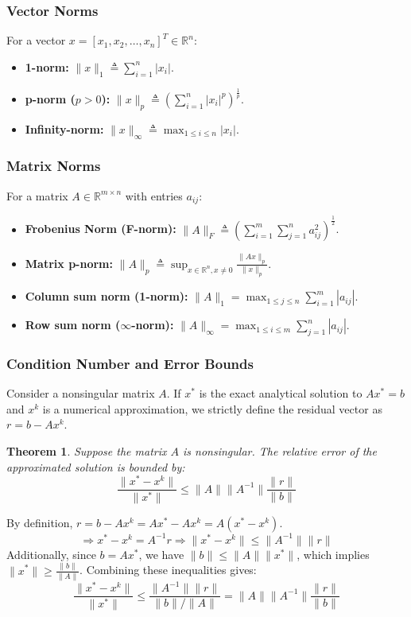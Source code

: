 \documentclass[12pt, a4paper]{article}
\makeatletter
\theoremstyle{break}
\newtheorem{theorem}{Theorem}[section]
\renewenvironment{proof}[1][\proofname]{\par
  \pushQED{\qed}%
  \normalfont \topsep6\p@\@plus6\p@\relax
  \trivlist
  \item[\hskip\labelsep\bfseries #1\@addpunct{.}]\mbox{}\newline\ignorespaces
}{%
  \popQED\endtrivlist\@endpefalse
}
\makeatother
\begin{document}
\subsubsection*{Vector Norms}
For a vector $x = [x_1, x_2, \dots, x_n]^T \in \mathbb{R}^n$:
\begin{itemize}
    \item \textbf{1-norm:} $\|x\|_1 \triangleq \sum_{i=1}^n |x_i|$.
    \item \textbf{p-norm ($p>0$):} $\|x\|_p \triangleq \left(\sum_{i=1}^n |x_i|^p\right)^{\frac{1}{p}}$.
    \item \textbf{Infinity-norm:} $\|x\|_\infty \triangleq \max_{1 \le i \le n} |x_i|$.
\end{itemize}

\subsubsection*{Matrix Norms}
For a matrix $A \in \mathbb{R}^{m \times n}$ with entries $a_{ij}$:
\begin{itemize}
    \item \textbf{Frobenius Norm (F-norm):} $\|A\|_F \triangleq \left(\sum_{i=1}^m \sum_{j=1}^n a_{ij}^2\right)^{\frac{1}{2}}$.
    \item \textbf{Matrix p-norm:} $\|A\|_p \triangleq \sup_{x \in \mathbb{R}^n, x \neq 0} \frac{\|Ax\|_p}{\|x\|_p}$.
    \item \textbf{Column sum norm (1-norm):} $\|A\|_1 = \max_{1 \le j \le n} \sum_{i=1}^m |a_{ij}|$.
    \item \textbf{Row sum norm ($\infty$-norm):} $\|A\|_\infty = \max_{1 \le i \le m} \sum_{j=1}^n |a_{ij}|$.
\end{itemize}

\subsubsection*{Condition Number and Error Bounds}
Consider a nonsingular matrix $A$. If $x^*$ is the exact analytical solution to $Ax^* = b$ and $x^k$ is a numerical approximation, we strictly define the residual vector as $r = b - Ax^k$. 

\begin{theorem}
Suppose the matrix $A$ is nonsingular. The relative error of the approximated solution is bounded by:
$$\frac{\|x^* - x^k\|}{\|x^*\|} \le \|A\| \|A^{-1}\| \frac{\|r\|}{\|b\|}$$
\end{theorem}

\begin{proof}
By definition, $r = b - Ax^k = Ax^* - Ax^k = A(x^* - x^k)$. 
$$\Rightarrow x^* - x^k = A^{-1}r \Rightarrow \|x^* - x^k\| \le \|A^{-1}\| \|r\|$$
Additionally, since $b = Ax^*$, we have $\|b\| \le \|A\| \|x^*\|$, which implies $\|x^*\| \ge \frac{\|b\|}{\|A\|}$.
Combining these inequalities gives:
$$\frac{\|x^* - x^k\|}{\|x^*\|} \le \frac{\|A^{-1}\| \|r\|}{\|b\| / \|A\|} = \|A\| \|A^{-1}\| \frac{\|r\|}{\|b\|}$$
\end{proof}
\end{document}
